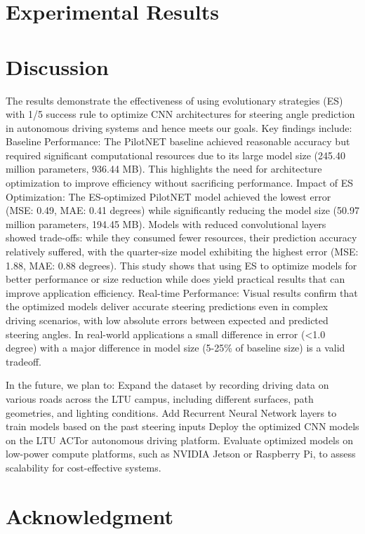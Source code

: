\documentclass[conference]{IEEEtran}
\begin{document}
\section{Experimental Results}

\section{Discussion}
The results demonstrate the effectiveness of using evolutionary strategies (ES) with 1/5 success rule to optimize CNN architectures for steering angle prediction in autonomous driving systems and hence meets our goals. Key findings include:
Baseline Performance: The PilotNET baseline achieved reasonable accuracy but required significant computational resources due to its large model size (245.40 million parameters, 936.44 MB).
This highlights the need for architecture optimization to improve efficiency without sacrificing performance.
Impact of ES Optimization: The ES-optimized PilotNET model achieved the lowest error (MSE: 0.49, MAE: 0.41 degrees) while significantly reducing the model size (50.97 million parameters, 194.45 MB). Models with reduced convolutional layers showed trade-offs: while they consumed fewer resources, their prediction accuracy relatively suffered, with the quarter-size model exhibiting the highest error (MSE: 1.88, MAE: 0.88 degrees). This study shows that using ES to optimize models for better performance or size reduction while does yield practical results that can improve application efficiency.
Real-time Performance: Visual results confirm that the optimized models deliver accurate steering predictions even in complex driving scenarios, with low absolute errors between expected and predicted steering angles. In real-world applications a small difference in error (<1.0 degree) with a major difference in model size (5-25\% of baseline size) is a valid tradeoff.

In the future, we plan to:
Expand the dataset by recording driving data on various roads across the LTU campus, including different surfaces, path geometries, and lighting conditions.
Add Recurrent Neural Network layers to train models based on the past steering inputs
Deploy the optimized CNN models on the LTU ACTor autonomous driving platform.
Evaluate optimized models on low-power compute platforms, such as NVIDIA Jetson or Raspberry Pi, to assess scalability for cost-effective systems.



\section*{Acknowledgment}
\end{document}
